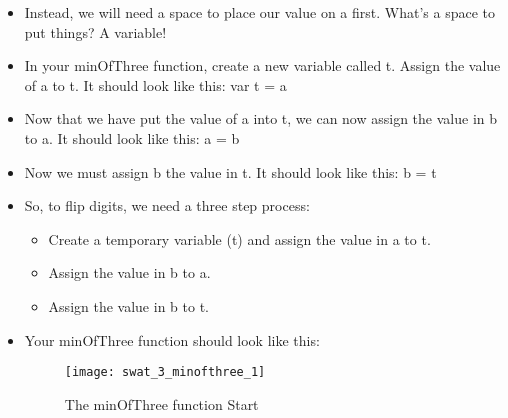 \documentclass{article}
\begin{document}
\begin{itemize}
	\item Instead, we will need a space to place our value on a first.  What's a space to put things?  A variable!
	\item In your minOfThree function, create a new variable called t.  Assign the value of a to t.  It should look like this:  var t = a
	\item Now that we have put the value of a into t, we can now assign the value in b to a.  It should look like this:  a = b
	\item Now we must assign b the value in t.  It should look like this:  b = t
	\item So, to flip digits, we need a three step process:  
	\begin{itemize}
		\item Create a temporary variable (t) and assign the value in a to t.
		\item Assign the value in b to a.
		\item Assign the value in b to t.
	\end{itemize} 
	\item Your minOfThree function should look like this:
	\begin{figure}[H]
  		\centering
  		\texttt{[image: swat\_3\_minofthree\_1]}
  		\caption{The minOfThree function Start}
	\end{figure}
\end{itemize}
\end{document}
